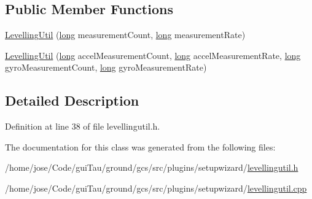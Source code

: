 \subsection*{Public Member Functions}
\begin{DoxyCompactItemize}
\item 
\hyperlink{group___levelling_util_ga01074f8582e6874acc1a566e55f30b53}{Levelling\-Util} (\hyperlink{ioapi_8h_a3c7b35ad9dab18b8310343c201f7b27e}{long} measurement\-Count, \hyperlink{ioapi_8h_a3c7b35ad9dab18b8310343c201f7b27e}{long} measurement\-Rate)
\item 
\hyperlink{group___levelling_util_ga7112024f171b944816a5c7cdeab07642}{Levelling\-Util} (\hyperlink{ioapi_8h_a3c7b35ad9dab18b8310343c201f7b27e}{long} accel\-Measurement\-Count, \hyperlink{ioapi_8h_a3c7b35ad9dab18b8310343c201f7b27e}{long} accel\-Measurement\-Rate, \hyperlink{ioapi_8h_a3c7b35ad9dab18b8310343c201f7b27e}{long} gyro\-Measurement\-Count, \hyperlink{ioapi_8h_a3c7b35ad9dab18b8310343c201f7b27e}{long} gyro\-Measurement\-Rate)
\end{DoxyCompactItemize}


\subsection{Detailed Description}


Definition at line 38 of file levellingutil.\-h.



The documentation for this class was generated from the following files\-:\begin{DoxyCompactItemize}
\item 
/home/jose/\-Code/gui\-Tau/ground/gcs/src/plugins/setupwizard/\hyperlink{levellingutil_8h}{levellingutil.\-h}\item 
/home/jose/\-Code/gui\-Tau/ground/gcs/src/plugins/setupwizard/\hyperlink{levellingutil_8cpp}{levellingutil.\-cpp}\end{DoxyCompactItemize}
